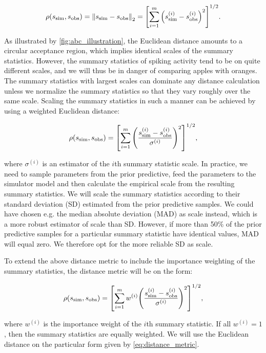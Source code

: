 \begin{equation*}
    \rho \qty(s_\mathrm{sim}, s_\mathrm{obs} ) = \norm{s_\mathrm{sim} - s_\mathrm{obs}}_2 = \qty[\sum_{i=1}^m \qty(s_\mathrm{sim}^{(i)} - s_\mathrm{obs}^{(i)} )^2 ]^{1/2}.
\end{equation*}

As illustrated by \autoref{fig:abc_illustration}, the Euclidean distance amounts to a circular acceptance region, which implies identical scales of the summary statistics. However, the summary statistics of spiking activity tend to be on quite different scales, and we will thus be in danger of comparing apples with oranges. The summary statistics with largest scales can dominate any distance calculation unless we normalize the summary statistics so that they vary roughly over the same scale. Scaling the summary statistics in such a manner can be achieved by using a weighted Euclidean distance: 

\begin{equation*}
    \rho \qty(s_\mathrm{sim}, s_\mathrm{obs} ) = \qty[\sum_{i=1}^m \qty(\frac{s_\mathrm{sim}^{(i)} - s_\mathrm{obs}^{(i)}}{\sigma^{(i)}} )^2 ]^{1/2},
\end{equation*}

where $\sigma^{(i)}$ is an estimator of the $i$th summary statistic scale. In practice, we need to sample parameters from the prior predictive, feed the parameters to the simulator model and then calculate the empirical scale from the resulting summary statistics. We will scale the summary statistics according to their standard deviation (SD) estimated from the prior predictive samples.  We could have chosen e.g. the median absolute deviation (MAD) as scale instead, which is a more robust estimator of scale than SD. However, if more than 50\% of the prior predictive samples for a particular summary statistic have identical values, MAD will equal zero. We therefore opt for the more reliable SD as scale. 

To extend the above distance metric to include the importance weighting of the summary statistics, the distance metric will be on the form:

\begin{equation}\label{eq:distance_metric}
    \rho \qty(s_\mathrm{sim}, s_\mathrm{obs} ) = \qty[\sum_{i=1}^m w^{(i)} \qty(\frac{s_\mathrm{sim}^{(i)} - s_\mathrm{obs}^{(i)}}{\sigma^{(i)}} )^2 ]^{1/2},
\end{equation}

where $w^{(i)}$ is the importance weight of the $i$th summary statistic. If all $w^{(i)}=1$, then the summary statistics are equally weighted. We will use the Euclidean distance on the particular form given by \autoref{eq:distance_metric}. 

